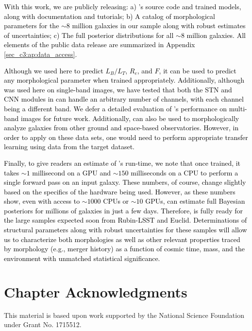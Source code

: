 \textcolor{black}{With this work, we are publicly releasing: a) \gampen{}'s source code and trained models, along with documentation and tutorials; b) A catalog of morphological parameters for the $\sim8$ million galaxies in our sample along with robust estimates of uncertainties; c) The full posterior distributions for all $\sim8$ million galaxies. All elements of the public data release are summarized in Appendix \ref{sec_c3:ap:data_access}.}

\textcolor{black}{Although we used \gampen{} here to predict $L_B/L_T$, $R_e$, and $F$, it can be used to predict any morphological parameter when trained appropriately. Additionally, although \gampen{} was used here on single-band images, we have tested that both the STN and CNN modules in \gampen{} can handle an arbitrary number of channels, with each channel being a different band. We defer a detailed evaluation of \gampen{}'s performance on multi-band images for future work. Additionally, \gampen{} can also be used to morphologically analyze galaxies from other ground and space-based observatories. However, in order to apply \gampen{} on these data sets, one would need to perform appropriate transfer learning using data from the target dataset.}

\textcolor{black}{Finally, to give readers an estimate of \gampen{}'s run-time, we note that once trained, it takes \gampen{} $\sim1$ millisecond on a GPU and $\sim150$ milliseconds on a CPU to perform a single forward pass on an input galaxy. These numbers, of course, change slightly based on the specifics of the hardware being used. However, as these numbers show, even with access to $\sim1000$ CPUs or $\sim10$ GPUs, \gampen{} can estimate full Bayesian posteriors for millions of galaxies in just a few days. Therefore, \gampen{} is fully ready for the large samples expected soon from Rubin-LSST and Euclid. Determinations of structural parameters along with robust uncertainties for these samples will allow us to characterize both morphologies as well as other relevant properties traced by morphology (e.g., merger history) as a function of cosmic time, mass, and the environment with unmatched statistical significance.}

\section*{Chapter Acknowledgments}
This material is based upon work supported by the National Science Foundation under Grant No. 1715512.

